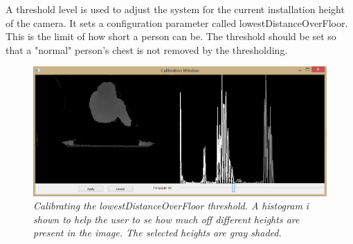 A threshold level is used to adjust the system for the current installation height of the camera. It sets a configuration parameter called lowestDistanceOverFloor. This is the limit of how short a person can be. The threshold should be set so that a "normal" person’s chest is not removed by the thresholding.

\begin{figure}[htb]
	\centering
	\includegraphics[width=\linewidth]{images/Calibration.png}
	\caption[Overview of the entire system]{\textit{Calibrating the lowestDistanceOverFloor threshold. A histogram i shown to help the user to se how much off different heights are present in the image. The selected heights are gray shaded.}}
	\label{fig:lowestDistanceOverFloor_calibration}  %
\end{figure}
